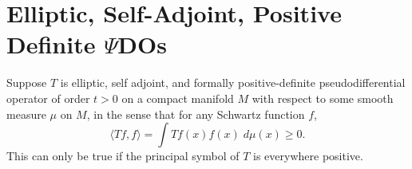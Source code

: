 \documentclass{article}
\DeclareMathOperator{\RR}{\mathbb{R}}
\theoremstyle{plain}
\theoremstyle{definition}
\begin{document}
\begin{comment}
\[ \int e^{2 \pi i [ \xi \cdot y - \theta \cdot \Phi(y) ]}\; dy \]



fix an open set $U$, and consider some $\psi_U \in C_c^\infty(\RR^d)$ supported on $U$. Then let $F: U \to V$ be a diffeomorphism. Given $\psi_V \in C_c^\infty(\RR^d)$, we can define an operator $S$ by setting
%
\[ Sf = T \{ F^{-1} \circ f \psi_V \} \]

We can then define an operator $S$

\end{comment}

\section{Elliptic, Self-Adjoint, Positive Definite $\Psi$DOs}

Suppose $T$ is elliptic, self adjoint, and formally positive-definite pseudodifferential operator of order $t > 0$ on a compact manifold $M$ with respect to some smooth measure $\mu$ on $M$, in the sense that for any Schwartz function $f$,
%
\[ \langle Tf, f \rangle = \int Tf(x) f(x)\; d\mu(x) \geq 0. \]
%
This can only be true if the principal symbol of $T$ is everywhere positive.
\end{document}
